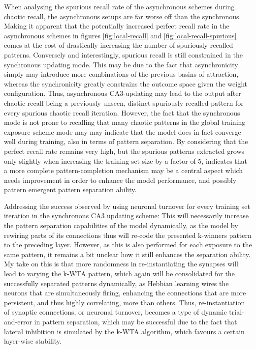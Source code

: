When analysing the spurious recall rate of the asynchronous schemes during chaotic recall, the asynchronous setups are far worse off than the synchronous. Making it apparent that the potentially increased perfect recall rate in the asynchronous schemes in figures \ref{fig:local-recall} and \ref{fig:local-recall-spurious} comes at the cost of drastically increasing the number of spuriously recalled patterns. Conversely and interestingly, spurious recall is still constrained in the synchronous updating mode. This may be due to the fact that asynchronicity simply may introduce more combinations of the previous basins of attraction, whereas the synchronicity greatly constrains the outcome space given the weight configuration. Thus, asynchronous CA3-updating may lead to the output after chaotic recall being a previously unseen, distinct spuriously recalled pattern for every spurious chaotic recall iteration. However, the fact that the synchronous mode is not prone to recalling that many chaotic patterns in the global training exposure scheme mode may may indicate that the model does in fact converge well during training, also in terms of pattern separation. By considering that the perfect recall rate remains very high, but the spurious patterns extracted grows only slightly when increasing the training set size by a factor of 5, indicates that a more complete pattern-completion mechanism may be a central aspect which needs improvement in order to enhance the model performance, and possibly pattern emergent pattern separation ability.

Addressing the success observed by using neuronal turnover for every training set iteration in the synchronous CA3 updating scheme: 
This will necessarily increase the pattern separation capabilities of the model dynamically, as the model by rewiring parts of its connections thus will re-code the presented k-winners pattern to the preceding layer. However, as this is also performed for each exposure to the same pattern, it remains a bit unclear how it still enhances the separation ability. My take on this is that more randomness in re-instantiating the synapses will lead to varying the k-WTA pattern, which again will be consolidated for the successfully separated patterns dynamically, as Hebbian learning wires the neurons that are simultaneously firing, enhancing the connections that are more persistent, and thus highly correlating, more than others. Thus, re-instantiation of synaptic connections, or neuronal turnover, becomes a type of dynamic trial-and-error in pattern separation, which may be successful due to the fact that lateral inhibition is simulated by the k-WTA algorithm, which favours a certain layer-wise stability.

